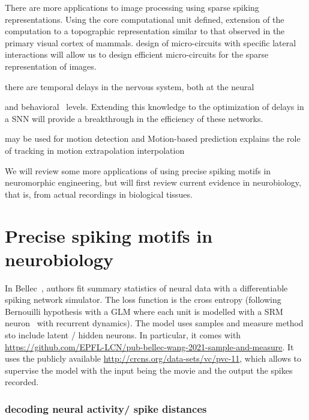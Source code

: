 \documentclass[brainsci, %
               review,submit,pdftex,moreauthors%
               ]{Definitions/mdpi}
\begin{document}
There are more applications to image processing using sparse spiking representations. Using the core computational unit defined, extension of the computation to a topographic representation similar to that observed in the primary visual cortex of mammals. design of micro-circuits with specific lateral interactions will allow us to design efficient micro-circuits for the sparse representation of images.


there are temporal delays in the nervous system, both at the neural~\citep{perrinet_active_2014} 

and behavioral~\citep{khoei_flash-lag_2017} levels. Extending this knowledge to the optimization of delays in a SNN will provide a breakthrough in the efficiency of these networks.

may be used for motion detection and Motion-based prediction explains the role of tracking in motion extrapolation interpolation~\citep{kaplan_anisotropic_2013}~\citep{khoei_flash-lag_2017}

We will review some more applications of using precise spiking motifs in neuromorphic engineering, but will first review current evidence in neurobiology, that is, from actual recordings in biological tissues.
 \section{Precise spiking motifs in neurobiology}


 In Bellec~\citep{bellec_fitting_2021}, authors fit summary statistics of neural data with a differentiable spiking network simulator. The loss function is the cross entropy (following Bernouilli hypothesis with a GLM where each unit is modelled with a SRM neuron~\citep{gerstner_time_1995} with recurrent dynamics). The model uses samples and measure method sto include latent / hidden neurons. In particular, it    comes with  \href{code}{https://github.com/EPFL-LCN/pub-bellec-wang-2021-sample-and-measure}. It uses the publicly available \href{V1-dataset}{http://crcns.org/data-sets/vc/pvc-11}, which allows to supervise the model with the input being the movie and the output the spikes recorded.

\subsubsection{decoding neural activity/ spike distances}
\end{document}
